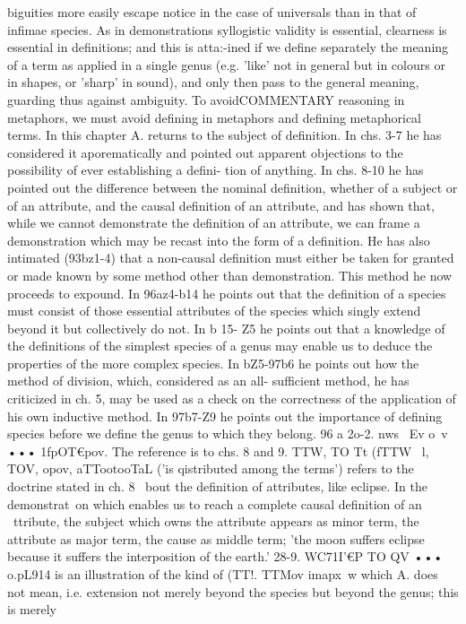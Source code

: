 {{{{{{{{{{{{{{{{{{{{{{{{{{{{{{{{{{{{{{{{{{{{{{{{{{{{{{{{{{{{{{{biguities more easily escape notice in the case of universals than
in that of infimae species. As in demonstrations syllogistic
validity is essential, clearness is essential in definitions; and this
is atta:-ined if we define separately the meaning of a term as
applied in a single genus (e.g. 'like' not in general but in colours
or in shapes, or 'sharp' in sound), and only then pass to the
general meaning, guarding thus against ambiguity. To avoidCOMMENTARY
reasoning in metaphors, we must avoid defining in metaphors
and defining metaphorical terms.
In this chapter A. returns to the subject of definition. In
chs. 3-7 he has considered it aporematically and pointed out
apparent objections to the possibility of ever establishing a defini-
tion of anything. In chs. 8-10 he has pointed out the difference
between the nominal definition, whether of a subject or of an
attribute, and the causal definition of an attribute, and has
shown that, while we cannot demonstrate the definition of an
attribute, we can frame a demonstration which may be recast
into the form of a definition. He has also intimated (93bz1-4) that
a non-causal definition must either be taken for granted or made
known by some method other than demonstration. This method
he now proceeds to expound. In 96az4-b14 he points out that the
definition of a species must consist of those essential attributes
of the species which singly extend beyond it but collectively do
not. In b 15- Z5 he points out that a knowledge of the definitions
of the simplest species of a genus may enable us to deduce the
properties of the more complex species. In bZ5-97b6 he points
out how the method of division, which, considered as an all-
sufficient method, he has criticized in ch. 5, may be used as a
check on the correctness of the application of his own inductive
method. In 97b7-Z9 he points out the importance of defining
species before we define the genus to which they belong.
96 a 2o-2. nws ~Ev o~v ••• 1fpOT€pov. The reference is to chs. 8
and 9. TTW, TO Tt (fTTW ~l, TOV, opov, aTTootooTaL ('is qistributed
among the terms') refers to the doctrine stated in ch. 8 ~bout the
definition of attributes, like eclipse. In the demonstrat~on which
enables us to reach a complete causal definition of an ~ttribute,
the subject which owns the attribute appears as minor term, the
attribute as major term, the cause as middle term; 'the moon
suffers eclipse because it suffers the interposition of the earth.'
28-9. WC71I'€P TO QV ••• o.pL914 is an illustration of the kind of
(TT!. TTMov imapx~w which A. does not mean, i.e. extension not
merely beyond the species but beyond the genus; this is merely
}}}}}}}}}}}}}}}}}}}}}}}}}}}}}}}}}}}}}}}}}}}}}}}}}}}}}}}}}}}}}}}
